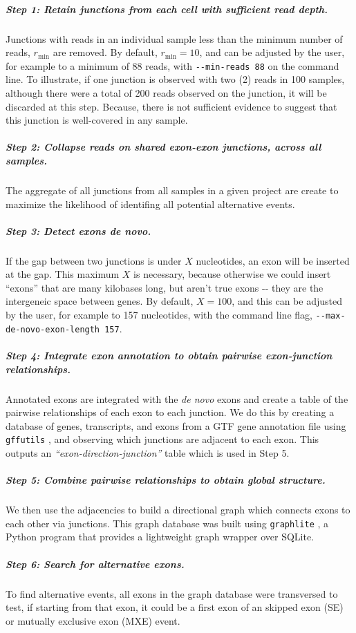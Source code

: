\subparagraph{Step 1: Retain junctions from each cell with sufficient read depth.} Junctions with reads in an individual sample less than the minimum number of reads, $r_{\min}$ are removed. By default, $r_{\min} = 10$, and can be adjusted by the user, for example to a minimum of 88 reads, with \texttt{-{}-min-reads~88} on the command line. To illustrate, if one junction is observed with two (2) reads in 100 samples, although there were a total of 200 reads observed on the junction, it will be discarded at this step. Because, there is not sufficient evidence to suggest that this junction is well-covered in any sample.

\subparagraph{Step 2: Collapse reads on shared exon-exon junctions, across all samples.} The aggregate of all junctions from all samples in a given project are create to maximize the likelihood of identifing all potential alternative events.

\subparagraph{Step 3: Detect exons \emph{de novo}.} If the gap between two junctions is under $X$ nucleotides, an exon will be inserted at the gap. This maximum $X$ is necessary, because otherwise we could insert ``exons'' that are many kilobases long, but aren't true exons -{}- they are the intergeneic space between genes. By default, $X = 100$, and this can be adjusted by the user, for example to 157 nucleotides, with the command line flag, \texttt{-{}-max-de-novo-exon-length~157}.

\subparagraph{Step 4: Integrate exon annotation to obtain pairwise exon-junction relationships.} Annotated exons are integrated with the \emph{de novo} exons and create a table of the pairwise relationships of each exon to each junction. We do this by creating a database of genes, transcripts, and exons from a GTF gene annotation file using \texttt{gffutils} \cite{Anonymous:sP8uhXuv}, and observing which junctions are adjacent to each exon. This outputs an \emph{``exon-direction-junction''} table which is used in Step 5.

\subparagraph{Step 5: Combine pairwise relationships to obtain global structure.} We then use the adjacencies to build a directional graph which connects exons to each other via junctions. This graph database was built using \texttt{graphlite} \cite{Anonymous:vt}, a Python program that provides a lightweight graph wrapper over SQLite.

\subparagraph{Step 6: Search for alternative exons.} To find alternative events, all exons in the graph database were transversed to test, if starting from that exon, it could be a first exon of an skipped exon (SE) or mutually exclusive exon (MXE) event.

